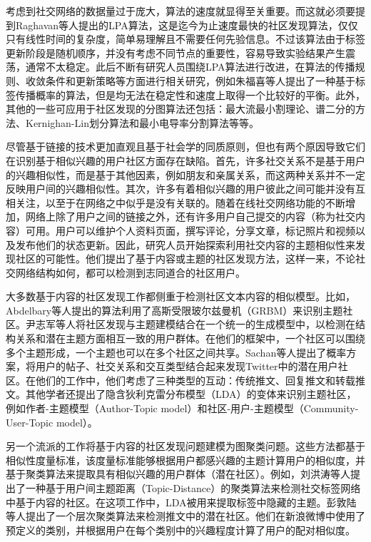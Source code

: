 考虑到社交网络的数据量过于庞大，算法的速度就显得至关重要。而这就必须要提到Raghavan等人提出的LPA算法\cite{Raghavan2007Near}，这是迄今为止速度最快的社区发现算法，仅仅只有线性时间的复杂度，简单易理解且不需要任何先验信息。不过该算法由于标签更新阶段是随机顺序，并没有考虑不同节点的重要性，容易导致实验结果产生震荡，通常不太稳定。此后不断有研究人员围绕LPA算法进行改进，在算法的传播规则、收敛条件和更新策略等方面进行相关研究，例如朱福喜等人提出了一种基于标签传播概率的算法\cite{Liu2016A}，但是均无法在稳定性和速度上取得一个比较好的平衡。此外，其他的一些可应用于社区发现的分图算法还包括：最大流最小割理论\cite{Jr2009Maximal}、谱二分的方法\cite{Pothen1990Partitioning}、Kernighan-Lin划分算法\cite{Kernigan1970An}和最小电导率分割算法\cite{Leskovec2005Graphs}等等。

尽管基于链接的技术更加直观且基于社会学的同质原则，但也有两个原因导致它们在识别基于相似兴趣的用户社区方面存在缺陷。首先，许多社交关系不是基于用户的兴趣相似性，而是基于其他因素，例如朋友和亲属关系，而这两种关系并不一定反映用户间的兴趣相似性。其次，许多有着相似兴趣的用户彼此之间可能并没有互相关注，以至于在网络之中似乎是没有关联的\cite{Deng2013Interaction}。随着在线社交网络功能的不断增加，网络上除了用户之间的链接之外，还有许多用户自己提交的内容（称为社交内容）可用。用户可以维护个人资料页面，撰写评论，分享文章，标记照片和视频以及发布他们的状态更新。因此，研究人员开始探索利用社交内容的主题相似性来发现社区的可能性。他们提出了基于内容或主题的社区发现方法，这样一来，不论社交网络结构如何，都可以检测到志同道合的社区用户\cite{Natarajan2013Community}。

大多数基于内容的社区发现工作都侧重于检测社区文本内容的相似模型。比如，Abdelbary等人提出的算法\cite{Abdelbary2014Utilizing}利用了高斯受限玻尔兹曼机（GRBM）来识别主题社区。尹志军等人\cite{Yin2012Latent}将社区发现与主题建模结合在一个统一的生成模型中，以检测在结构关系和潜在主题方面相互一致的用户群体。在他们的框架中，一个社区可以围绕多个主题形成，一个主题也可以在多个社区之间共享。Sachan等人\cite{Sachan2012Using}提出了概率方案，将用户的帖子、社交关系和交互类型结合起来发现Twitter中的潜在用户社区。在他们的工作中，他们考虑了三种类型的互动：传统推文、回复推文和转载推文。其他学者还提出了隐含狄利克雷分布模型（LDA）的变体来识别主题社区，例如作者-主题模型（Author-Topic model）\cite{RosenZvi2012The}和社区-用户-主题模型（Community-User-Topic model）\cite{Zhou2006Probabilistic}。

另一个流派的工作将基于内容的社区发现问题建模为图聚类问题。这些方法都基于相似性度量标准，该度量标准能够根据用户都感兴趣的主题计算用户的相似度，并基于聚类算法来提取具有相似兴趣的用户群体（潜在社区）。例如，刘洪涛等人\cite{Liu2014Community}提出了一种基于用户间主题距离（Topic-Distance）的聚类算法来检测社交标签网络中基于内容的社区。在这项工作中，LDA被用来提取标签中隐藏的主题。彭敦陆等人\cite{Peng2015DICH}提出了一个层次聚类算法来检测推文中的潜在社区。他们在新浪微博中使用了预定义的类别，并根据用户在每个类别中的兴趣程度计算了用户的配对相似度。

